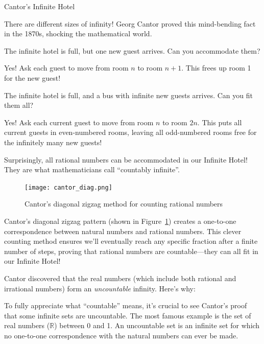 \begin{funfactsbreak}{Cantor's Infinite Hotel}

 There are different sizes of infinity! Georg Cantor proved this mind-bending fact in the 1870s, shocking the mathematical world.


 The infinite hotel is full, but one new guest arrives. Can you accommodate them?

 Yes! Ask each guest to move from room $n$ to room $n+1$. This frees up room 1 for the new guest!

 The infinite hotel is full, and a bus with infinite new guests arrives. Can you fit them all?

 Yes! Ask each current guest to move from room $n$ to room $2n$. This puts all current guests in even-numbered rooms, leaving all odd-numbered rooms free for the infinitely many new guests!


Surprisingly, all rational numbers can be accommodated in our Infinite Hotel! They are what mathematicians call ``countably infinite''.

\begin{figure}[H]
    \centering
    \texttt{[image: cantor\_diag.png]}
    \caption{Cantor's diagonal zigzag method for counting rational numbers}
    \label{fig:cantor_diag}
\end{figure}

 Cantor's diagonal zigzag pattern (shown in Figure~\ref{fig:cantor_diag}) creates a one-to-one correspondence between natural numbers and rational numbers. This clever counting method ensures we'll eventually reach any specific fraction after a finite number of steps, proving that rational numbers are countable—they can all fit in our Infinite Hotel!


Cantor discovered that the real numbers (which include both rational and irrational numbers) form an \textit{uncountable} infinity. Here's why:


To fully appreciate what ``countable'' means, it's crucial to see Cantor's proof that some infinite sets are uncountable. The most famous example is the set of real numbers ($\mathbb{R}$) between 0 and 1. An uncountable set is an infinite set for which no one-to-one correspondence with the natural numbers can ever be made.


\end{funfactsbreak}
